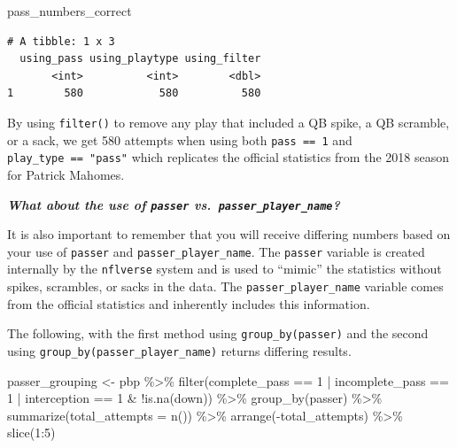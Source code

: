 \documentclass[
  letterpaper,
]{krantz}
\newenvironment{Shaded}{\begin{snugshade}}{\end{snugshade}}
\newcommand{\AttributeTok}[1]{\textcolor[rgb]{0.40,0.45,0.13}{#1}}
\newcommand{\DecValTok}[1]{\textcolor[rgb]{0.68,0.00,0.00}{#1}}
\newcommand{\FunctionTok}[1]{\textcolor[rgb]{0.28,0.35,0.67}{#1}}
\newcommand{\NormalTok}[1]{\textcolor[rgb]{0.00,0.23,0.31}{#1}}
\newcommand{\OtherTok}[1]{\textcolor[rgb]{0.00,0.23,0.31}{#1}}
\newcommand{\SpecialCharTok}[1]{\textcolor[rgb]{0.37,0.37,0.37}{#1}}
\begin{document}
\begin{tcolorbox}
\begin{Shaded}
\begin{Highlighting}[]
\NormalTok{pass\_numbers\_correct}
\end{Highlighting}
\end{Shaded}

\begin{verbatim}
# A tibble: 1 x 3
  using_pass using_playtype using_filter
       <int>          <int>        <dbl>
1        580            580          580
\end{verbatim}

By using \texttt{filter()} to remove any play that included a QB spike,
a QB scramble, or a sack, we get 580 attempts when using both
\texttt{pass\ ==\ 1} and \texttt{play\_type\ ==\ "pass"} which
replicates the official statistics from the 2018 season for Patrick
Mahomes.

\textbf{\emph{What about the use of \texttt{passer}
vs.~\texttt{passer\_player\_name}?}}

It is also important to remember that you will receive differing numbers
based on your use of \texttt{passer} and \texttt{passer\_player\_name}.
The \texttt{passer} variable is created internally by the
\texttt{nflverse} system and is used to ``mimic'' the statistics without
spikes, scrambles, or sacks in the data. The
\texttt{passer\_player\_name} variable comes from the official
statistics and inherently includes this information.

The following, with the first method using \texttt{group\_by(passer)}
and the second using \texttt{group\_by(passer\_player\_name)} returns
differing results.

\begin{Shaded}
\begin{Highlighting}[]
\NormalTok{passer\_grouping }\OtherTok{\textless{}{-}}\NormalTok{ pbp }\SpecialCharTok{\%\textgreater{}\%}
  \FunctionTok{filter}\NormalTok{(complete\_pass }\SpecialCharTok{==} \DecValTok{1} \SpecialCharTok{|}
\NormalTok{           incomplete\_pass }\SpecialCharTok{==} \DecValTok{1} \SpecialCharTok{|}
\NormalTok{           interception }\SpecialCharTok{==} \DecValTok{1} \SpecialCharTok{\&} \SpecialCharTok{!}\FunctionTok{is.na}\NormalTok{(down)) }\SpecialCharTok{\%\textgreater{}\%}
  \FunctionTok{group\_by}\NormalTok{(passer) }\SpecialCharTok{\%\textgreater{}\%}
  \FunctionTok{summarize}\NormalTok{(}\AttributeTok{total\_attempts =} \FunctionTok{n}\NormalTok{()) }\SpecialCharTok{\%\textgreater{}\%}
  \FunctionTok{arrange}\NormalTok{(}\SpecialCharTok{{-}}\NormalTok{total\_attempts) }\SpecialCharTok{\%\textgreater{}\%}
  \FunctionTok{slice}\NormalTok{(}\DecValTok{1}\SpecialCharTok{:}\DecValTok{5}\NormalTok{)}


\end{Highlighting}
\end{Shaded}
\end{tcolorbox}
\end{document}
